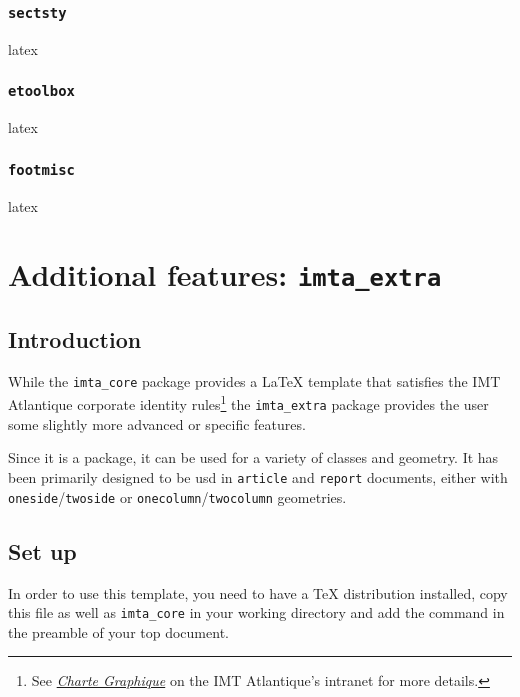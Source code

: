 \documentclass{report}
\begin{document}
\subsection{\texttt{sectsty}}
\begin{imtaCode}{latex}
\RequirePackage{sectsty}
\end{imtaCode}

\subsection{\texttt{etoolbox}}
\begin{imtaCode}{latex}
\RequirePackage{etoolbox}
\end{imtaCode}

\subsection{\texttt{footmisc}}
\begin{imtaCode}{latex}
\RequirePackage[bottom]{footmisc}
\end{imtaCode}

\chapter{Additional features: \texttt{imta\_extra}}

\section{Introduction}
While the \texttt{imta\_core} package provides a \LaTeX{} template that satisfies the IMT Atlantique corporate identity rules\footnote{See \textit{\href{https://intranet.imt-atlantique.fr/wp-content/uploads/2017/01/imt_atlantique_chartegraphique.pdf}{Charte Graphique}} on the IMT Atlantique's intranet for more details.} the \texttt{imta\_extra} package provides the user some slightly more advanced or specific features.

Since it is a package, it can be used for a variety of classes and geometry. It has been primarily designed to be usd in \texttt{article} and \texttt{report} documents, either with \texttt{oneside}/\texttt{twoside} or \texttt{onecolumn}/\texttt{twocolumn} geometries.

\section{Set up}
In order to use this template, you need to have a \TeX{} distribution installed, copy this file as well as \texttt{imta\_core} in your working directory and add the  command in the preamble of your top document.
\end{document}
